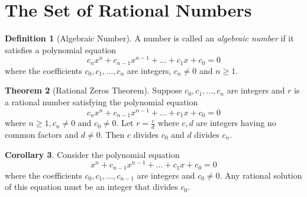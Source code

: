 \documentclass{book}
\theoremstyle{definition}
\newtheorem{definition}{Definition}[section]
\newtheorem{theorem}[definition]{Theorem}
\newtheorem{corollary}[definition]{Corollary}
\begin{document}
\section{The Set of Rational Numbers}
\begin{definition}[Algebraic Number]
A number is called an \textit{algebraic number} if it satisfies a polynomial equation
\begin{equation*}
    c_nx^n + c_{n-1}x^{n-1} + ... + c_1x + c_0 = 0
\end{equation*}
where the coefficients $c_0, c_1, ..., c_n$ are integers, $c_n \neq 0$ and $n \geq 1$.
\end{definition}
\begin{theorem}[Rational Zeros Theorem]
Suppose $c_0, c_1,...,c_n$ are integers and $r$ is a rational number satisfying the polynomial equation
\begin{equation}
    c_nx^n + c_{n-1}x^{n-1} + ... + c_1x + c_0 = 0
\end{equation}
where $n \geq 1, c_n \neq 0$ and $c_0 \neq 0$. Let $r = \frac{c}{d}$ where $c,d$ are integers having no common factors and $d \neq 0$. Then $c$ divides $c_0$ and $d$ divides $c_n$.
\end{theorem}
\begin{corollary}
Consider the polynomial equation
\begin{equation*}
    x^n + c_{n-1}x^{n-1} + ... + c_1x + c_0 = 0
\end{equation*}
where the coefficients $c_0, c_1, ..., c_{n-1}$ are integers and $c_0 \neq 0$. Any rational solution of this equation must be an integer that divides $c_0$.
\end{corollary}
\end{document}

